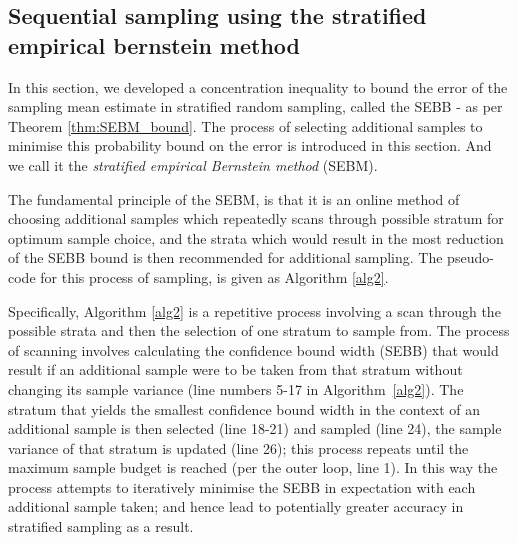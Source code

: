 \subsection{Sequential sampling using the stratified empirical bernstein method\DIFdelbegin {}\DIFdelend } \label{sec:SEBMalgorithm}



In this section, we developed a concentration inequality to bound the error of the sampling mean estimate in stratified random sampling, called the SEBB - as per Theorem \ref{thm:SEBM_bound}.
The process of selecting additional samples to minimise this probability bound on the error is introduced in this section. And we call it the \textit{stratified empirical Bernstein method} (SEBM).

The fundamental principle of the SEBM, is that it is an online method of choosing additional samples which repeatedly scans through possible stratum for optimum sample choice, and the strata which would result in the most reduction of the SEBB bound is then recommended for additional sampling.
The pseudo-code for this process of sampling, is given as Algorithm \ref{alg2}.


Specifically, Algorithm \ref{alg2} is a repetitive process involving a scan through the possible strata and then the selection of one stratum to sample from.
The process of scanning involves calculating the confidence bound width (SEBB) that would result if an additional sample were to be taken from that stratum without changing its sample variance (line numbers 5-17 in Algorithm~\ref{alg2}).
The stratum that yields the smallest confidence bound width in the context of an additional sample is then selected (line 18-21) and sampled (line 24), the sample variance of that stratum is updated (line 26); 
this process repeats until the maximum sample budget is reached (per the outer loop, line 1).
In this way the process attempts to iteratively minimise the SEBB in expectation with each additional sample taken; and hence lead to potentially greater accuracy in stratified sampling as a result.

